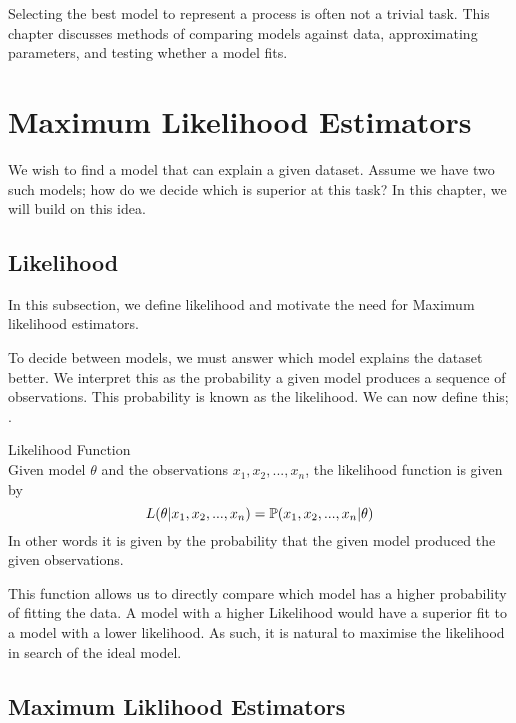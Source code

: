 
Selecting the best model to represent a process is often not a trivial task. This chapter discusses methods of comparing models against data, approximating parameters, and testing whether a model fits. 

\section{Maximum Likelihood Estimators}
\label{Model_Selection:Maximum_Liklihood_Estimators}

We wish to find a model that can explain a given dataset. Assume we have two such models; how do we decide which is superior at this task? In this chapter, we will build on this idea. 

    \subsection{Likelihood}
    \label{Model_Selection:Maximum_Liklihood_Estimators:Likelihood}

    In this subsection, we define likelihood and motivate the need for Maximum likelihood estimators.

    To decide between models, we must answer which model explains the dataset better. We interpret this as the probability a given model produces a sequence of observations. This probability is known as the likelihood. We can now define this; \cite{Ross2004}.

    \begin{definition} Likelihood Function \\
        Given model $\theta$ and the observations $x_1, x_2,...,x_n$, the likelihood function is given by
        \begin{equation}
            \label{Definition:Likelihood}
            L(\theta|x_1, x_2,...,x_n) = \mathbb{P}(x_1, x_2,...,x_n|\theta)
        \end{equation} 
        In other words it is given by the probability that the given model produced the given observations.
    \end{definition}

    This function allows us to directly compare which model has a higher probability of fitting the data. A model with a higher Likelihood would have a superior fit to a model with a lower likelihood. As such, it is natural to maximise the likelihood in search of the ideal model. 

    \subsection{Maximum Liklihood Estimators}
    \label{Model_Selection:Maximum_Liklihood_Estimators:MLE}


